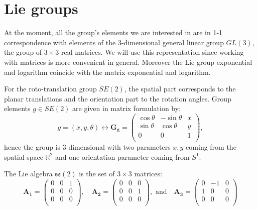 \documentclass{article}
\begin{document}
\clearpage

\section{Lie groups} \label{app:lie_groups}

At the moment, all the group's elements we are interested in are in 1-1 correspondence with elements of the 3-dimensional general linear group $GL(3)$, the group of $3 \times 3$ real matrices. We will use this representation since working with matrices is more convenient in general. Moreover the Lie group exponential and logarithm coincide with the matrix exponential and logarithm.

For the roto-translation group  $SE(2)$, the spatial part corresponds to the planar translations and the orientation part to the rotation angles. Group elements $g \in SE(2)$ are given in matrix formulation by:
\begin{equation}
g = (x, y, \theta) \leftrightarrow 
\boldsymbol{G_g} = 
\left(
\begin{array}{ccc}
\cos \theta & - \sin \theta & x \\
\sin \theta & \cos \theta & y \\
0 & 0 & 1 \\
\end{array}
\right),
\end{equation}
hence the group is 3 dimensional with two parameters $x,y$ coming from the spatial space $\mathbb{R}^2$ and one orientation parameter coming from $S^1$.

The Lie algebra $\mathfrak{se}(2)$ is the set of $3 \times 3$ matrices:
\begin{equation}
\boldsymbol{A_1} = 
\left(
\begin{array}{ccc}
0 & 0 & 1 \\
0 & 0 & 0 \\
0 & 0 & 0 \\
\end{array}
\right)
, \quad
\boldsymbol{A_2} = 
\left(
\begin{array}{ccc}
0 & 0 & 0  \\
0 & 0 & 1 \\
0 & 0 & 0 \\
\end{array}
\right)
, \text{ and} \quad
\boldsymbol{A_3} = 
\left(
\begin{array}{ccc}
0 & -1 & 0 \\
1 & 0 & 0 \\
0 & 0 & 0 \\
\end{array}
\right)
\end{equation}
\end{document}

